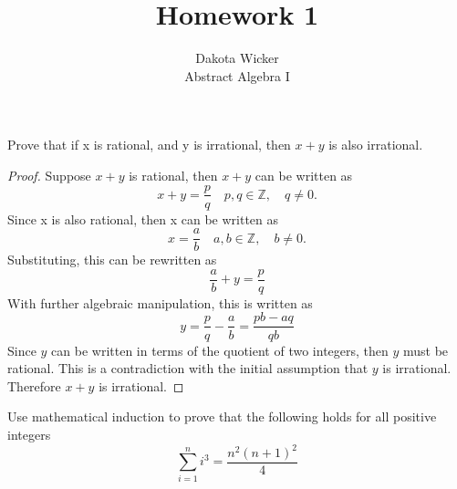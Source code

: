 \documentclass[12pt]{article}
\newenvironment{problem}[2][Problem]{\begin{trivlist}
\item[\hskip \labelsep {\bfseries #1}\hskip \labelsep {\bfseries #2.}]}{\end{trivlist}}
\begin{document}
 
 
\title{Homework 1}%
\author{Dakota Wicker\\ %
Abstract Algebra I} %
 
\maketitle
 
\begin{problem}{1} %
Prove that if x is rational, and y is irrational, then $x + y$ is also irrational.
\end{problem}
 
\begin{proof}
Suppose $x+y$ is rational, then $x+y$ can be written as
$$x + y = \frac{p}{q} \quad  p,q \in \mathbb{Z}, \quad q\neq 0.$$
Since x is also rational, then x can be written as 
$$x = \frac{a}{b} \quad a,b \in \mathbb{Z}, \quad b\neq 0.$$
Substituting, this can be rewritten as
$$\frac{a}{b} + y = \frac{p}{q}$$
With further algebraic manipulation, this is written as
$$y = \frac{p}{q} - \frac{a}{b} = \frac{pb-aq}{qb}$$
Since $y$ can be written in terms of the quotient of two integers, then $y$ must be rational. This is a contradiction with the initial assumption that $y$ is irrational. Therefore $x+y$ is irrational.
\end{proof}
 
\begin{problem}{2}
Use mathematical induction to prove that the following holds for all positive integers $$\sum_{i=1}^{n}i^3 = \frac{n^2(n+1)^2}{4}$$
\end{problem}
\end{document}
